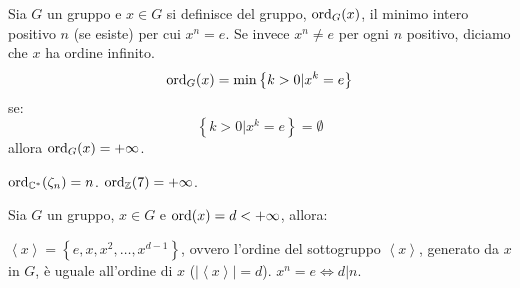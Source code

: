 \documentclass[11pt]{scrartcl}
\begin{document}
\begin{definition}
	Sia $G$ un gruppo e $x \in G$ si definisce  del gruppo, $\operatorname{ord}_{G}(x)$, il minimo intero positivo $n$ (se esiste) per cui $x^n=e$. Se invece $x^n \ne e$ per ogni $n$ positivo, diciamo che $x$ ha ordine infinito.
	\[ \operatorname{ord}_{G}(x)
	=
	\min\left\{k>0 | x^{k}=e\right\}
	\]
	se:
	\[ \left\{k>0 | x^{k}=e\right\}
	=
	\emptyset
	\]
	allora $\operatorname{ord}_{G}(x)=+\infty$.
\end{definition}

\begin{example}
\listhack
	\begin{itemize}
	\ii $\operatorname{ord}_{\mathbb C^*}(\zeta_n)=n$.
	\ii $\operatorname{ord}_{\mathbb Z}(7)=+\infty$.
	\end{itemize}
\end{example}

\begin{theorem}
\label{thm:g_due}
Sia $G$ un gruppo, $x \in G$ e $\operatorname{ord}(x)=d<+\infty$, allora:
	\begin{enumerate}[(1)]
	\ii $\left<x\right>=\left\{e, x, x^2, \ldots, x^{d-1}\right\}$, ovvero l'ordine del sottogruppo $\left<x\right>$, generato da $x$ in $G$, è uguale all'ordine di $x$ ($|\left<x\right>|=d$).
	\ii $x^n=e \iff d|n$.
	\end{enumerate}
\end{theorem}
\end{document}
